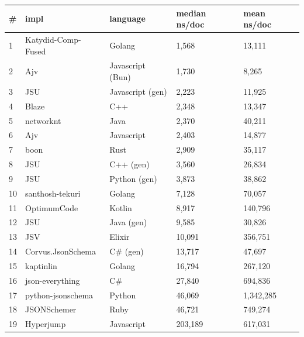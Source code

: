 \begin{tabular}{ll|l|ll}
\# & impl & language & median ns/doc & mean ns/doc \\
\hline
1 & Katydid-Comp-Fused & Golang & 1,568 & 13,111 \\
2 & Ajv & Javascript (Bun) & 1,730 & 8,265 \\
3 & JSU & Javascript (gen) & 2,223 & 11,925 \\
4 & Blaze & C++ & 2,348 & 13,347 \\
5 & networknt & Java & 2,370 & 40,211 \\
6 & Ajv & Javascript & 2,403 & 14,877 \\
7 & boon & Rust & 2,909 & 35,117 \\
8 & JSU & C++ (gen) & 3,560 & 26,834 \\
9 & JSU & Python (gen) & 3,873 & 38,862 \\
10 & santhosh-tekuri & Golang & 7,128 & 70,057 \\
11 & OptimumCode & Kotlin & 8,917 & 140,796 \\
12 & JSU & Java (gen) & 9,585 & 30,826 \\
13 & JSV & Elixir & 10,091 & 356,751 \\
14 & Corvus.JsonSchema & C\# (gen) & 13,717 & 47,697 \\
15 & kaptinlin & Golang & 16,794 & 267,120 \\
16 & json-everything & C\# & 27,840 & 694,836 \\
17 & python-jsonschema & Python & 46,069 & 1,342,285 \\
18 & JSONSchemer & Ruby & 46,721 & 749,274 \\
19 & Hyperjump & Javascript & 203,189 & 617,031 \\
\end{tabular}
